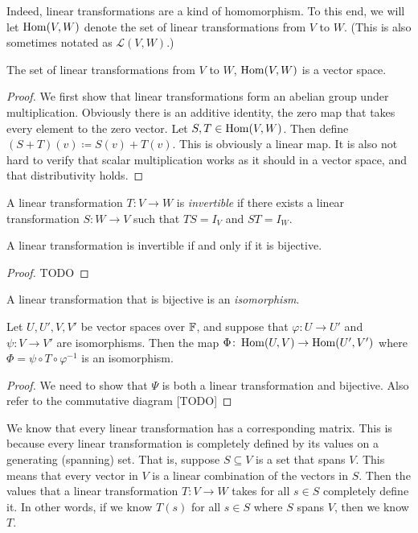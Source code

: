 Indeed, linear transformations are a kind of homomorphism. To this end, we will let $\operatorname{Hom}(V, W)$ denote the set of linear transformations from $V$ to $W$. (This is also sometimes notated as $\mathcal{L}(V, W)$.)

\begin{proposition}
  The set of linear transformations from $V$ to $W$, $\operatorname{Hom}(V, W)$ is a vector space.
\end{proposition}
\begin{proof}
  We first show that linear transformations form an abelian group under multiplication. Obviously there is an additive identity, the zero map that takes every element to the zero vector. Let $S, T \in \operatorname{Hom}(V, W)$. Then define $(S+T)(v) \coloneq S(v) + T(v)$. This is obviously a linear map. It is also not hard to verify that scalar multiplication works as it should in a vector space, and that distributivity holds.
\end{proof}

\begin{definition}
  A linear transformation $T\colon V \to W$ is \emph{invertible} if there exists a linear transformation $S\colon W \to V$ such that $TS = I_{V}$ and $ST = I_{W}$.
\end{definition}

\begin{proposition}
  A linear transformation is invertible if and only if it is bijective.
\end{proposition}
\begin{proof}
  TODO
\end{proof}

\begin{definition}
  A linear transformation that is bijective is an \emph{isomorphism}.
\end{definition}

\begin{proposition}
  Let $U, U', V, V'$ be vector spaces over $\mathbb{F}$, and suppose that $\varphi \colon U \to U'$ and $\psi \colon V \to V'$ are isomorphisms. Then the map $\Phi \colon \operatorname{Hom}(U, V) \to \operatorname{Hom}(U', V')$ where $\Phi = \psi \circ T \circ \varphi^{-1}$ is an isomorphism.
\end{proposition}
\begin{proof}
  We need to show that $\Psi$ is both a linear transformation and bijective. Also refer to the commutative diagram [TODO]
\end{proof}

We know that every linear transformation has a corresponding matrix. This is because every linear transformation is completely defined by its values on a generating (spanning) set. That is, suppose $S \subseteq V$ is a set that spans $V$. This means that every vector in $V$ is a linear combination of the vectors in $S$. Then the values that a linear transformation $T\colon V \to W$ takes for all $s \in S$ completely define it. In other words, if we know $T(s)$ for all $s \in S$ where $S$ spans $V$, then we know $T$.

